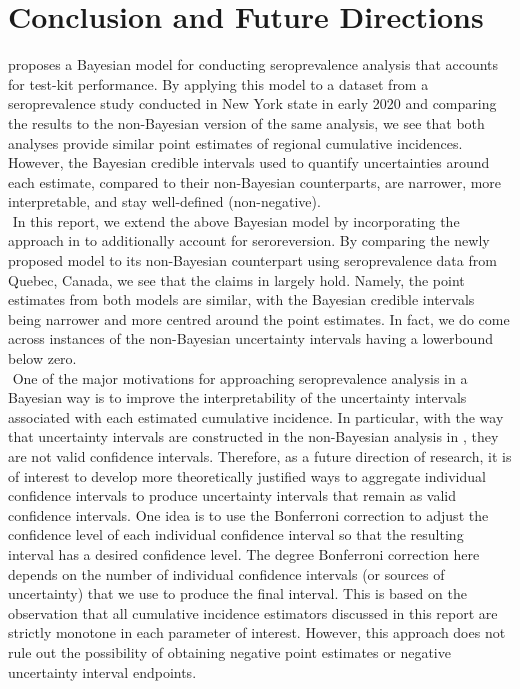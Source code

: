 \section{Conclusion and Future Directions}
\cite{meyer2022adjusting} proposes a Bayesian model for conducting seroprevalence analysis that accounts for test-kit performance. By applying this model to a dataset from a seroprevalence study conducted in New York state in early 2020 and comparing the results to the non-Bayesian version of the same analysis, we see that both analyses provide similar point estimates of regional cumulative incidences. However, the Bayesian credible intervals used to quantify uncertainties around each estimate, compared to their non-Bayesian counterparts, are narrower, more interpretable, and stay well-defined (non-negative).\\
\newline$ $
In this report, we extend the above Bayesian model by incorporating the approach in \cite{lewin2022seroprevalence} to additionally account for seroreversion. By comparing the newly proposed model to its non-Bayesian counterpart using seroprevalence data from Quebec, Canada, we see that the claims in \cite{meyer2022adjusting} largely hold. Namely, the point estimates from both models are similar, with the Bayesian credible intervals being narrower and more centred around the point estimates. In fact, we do come across instances of the non-Bayesian uncertainty intervals having a lowerbound below zero.\\
\newline$ $
One of the major motivations for approaching seroprevalence analysis in a Bayesian way is to improve the interpretability of the uncertainty intervals associated with each estimated cumulative incidence. In particular, with the way that uncertainty intervals are constructed in the non-Bayesian analysis in \cite{meyer2022adjusting}, they are not valid confidence intervals. Therefore, as a future direction of research, it is of interest to develop more theoretically justified ways to aggregate individual confidence intervals to produce uncertainty intervals that remain as valid confidence intervals. One idea is to use the Bonferroni correction to adjust the confidence level of each individual confidence interval so that the resulting interval has a desired confidence level. The degree Bonferroni correction here depends on the number of individual confidence intervals (or sources of uncertainty) that we use to produce the final interval. This is based on the observation that all cumulative incidence estimators discussed in this report are strictly monotone in each parameter of interest. However, this approach does not rule out the possibility of obtaining negative point estimates or negative uncertainty interval endpoints.\\
